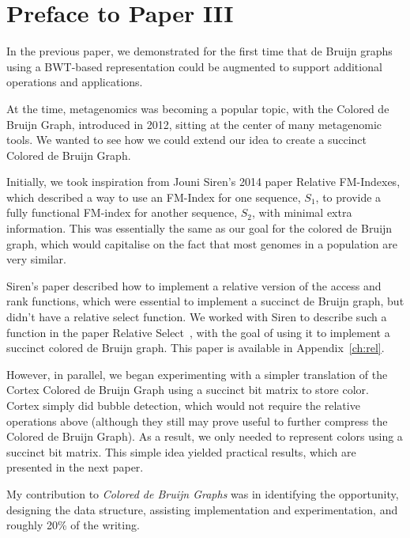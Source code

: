 \chapter*{Preface to Paper III}

In the previous paper, we demonstrated for the first time that de Bruijn graphs using a BWT-based representation could be augmented to support additional operations and applications.

At the time, metagenomics was becoming a popular topic, with the Colored de Bruijn Graph, introduced in 2012, sitting at the center of many metagenomic tools. We wanted to see how we could extend our idea to create a succinct Colored de Bruijn Graph.

Initially, we took inspiration from Jouni Siren's 2014 paper Relative FM-Indexes, which described a way to use an FM-Index for one sequence, $S_1$, to provide a fully functional FM-index for another sequence, $S_2$, with minimal extra information. This was essentially the same as our goal for the colored de Bruijn graph, which would capitalise on the fact that most genomes in a population are very similar.

Siren's paper described how to implement a relative version of the access and rank functions, which were essential to implement a succinct de Bruijn graph, but didn't have a relative select function. We worked with Siren to describe such a function in the paper Relative Select~\cite{boucher15}, with the goal of using it to implement a succinct colored de Bruijn graph. This paper is available in Appendix~\ref{ch:rel}.

However, in parallel, we began experimenting with a simpler translation of the Cortex Colored de Bruijn Graph using a succinct bit matrix to store color. Cortex simply did bubble detection, which would not require the relative operations above (although they still may prove useful to further compress the Colored de Bruijn Graph). As a result, we only needed to represent colors using a succinct bit matrix. This simple idea yielded practical results, which are presented in the next paper.

My contribution to \textit{Colored de Bruijn Graphs} was in identifying the opportunity, designing the data structure, assisting implementation and experimentation, and roughly 20\% of the writing.